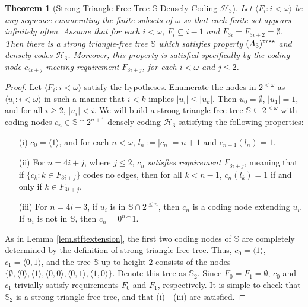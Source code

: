 \documentclass{amsart}
\newtheorem{thm}{Theorem}[section]
\theoremstyle{remark}
\theoremstyle{definition}
\theoremstyle{remark}
\newcommand{\om}{\omega}
\newcommand{\sse}{\subseteq}
\newcommand{\bS}{\mathbb{S}}
\newcommand{\lgl}{\langle}
\newcommand{\rgl}{\rangle}
\begin{document}
\begin{thm}[Strong Triangle-Free Tree $\bS$  Densely Coding $\mathcal{H}_3$]\label{thm.stftree}
Let  $\lgl F_i:i<\om\rgl$  be any sequence enumerating the finite subsets of $\om$  so  that each finite set appears infinitely often.
Assume  that
  for each $i<\om$,
 $F_i\sse i-1$ and  $F_{3i}=F_{3i+2}=\emptyset$.
Then there is a strong triangle-free tree $\bS$ which
 satisfies
property $(A_3)^{\tt tree}$
and
 densely codes $\mathcal{H}_3$.
Moreover, this property is satisfied specifically by
the coding node $c_{4i+j}$  meeting  requirement $F_{3i+j}$,
 for each $i<\om$ and $j\le 2$.
\end{thm}



\begin{proof}
Let  $\lgl F_i:i<\om \rgl$  satisfy the hypotheses.
Enumerate the nodes in $2^{<\om}$ as
 $\lgl u_i: i<\om\rgl$
 in such a manner that $i<k$ implies $|u_i|\le |u_k|$.
Then $u_0=\emptyset$, $|u_1|=1$, and for all $i\ge 2$, $|u_i|<i$.
We will build a strong triangle-free tree $\bS\sse 2^{<\om}$ with  coding nodes $c_n\in\bS\cap 2^{n+1}$ densely coding $\mathcal{H}_3$ satisfying the following properties:
\begin{enumerate}


\item[(i)]
$c_0=\lgl 1\rgl$, and
for each $n<\om$,  $l_n:=|c_n|=n+1$ and   $c_{n+1}(l_n)=1$.
\item[(ii)]
For $n=4i+j$, where  $j\le 2$, $c_{n}$ {\em satisfies requirement $F_{3i+j}$},
meaning that if $\{c_k:k\in F_{3i+j}\}$ codes no edges,
then for all $k< n-1$,
$c_n(l_k)=1$ if and only if $k\in F_{3i+j}$.
\item[(iii)]
For $n=4i+3$, if $u_i$ is in  $\bS\cap 2^{\le n}$,
then $c_n$ is a coding node extending $u_i$.
If $u_i$ is not in
$\bS$, then
 $c_n={0^n}^{\frown}1$.
\end{enumerate}


As in Lemma \ref{lem.stftextension},
the first two coding nodes of $\bS$ are completely determined by the definition of strong triangle-free tree.
Thus, $c_0=\lgl 1\rgl$, $c_1=\lgl 0,1\rgl$,
and the tree $\bS$ up to height $2$ consists of the nodes
$\{\emptyset,\lgl 0\rgl, \lgl 1\rgl, \lgl 0,0\rgl,\lgl 0,1\rgl,\lgl 1,0\rgl\}$.
Denote this tree as $\bS_2$.
Since  $F_0=F_1=\emptyset$,  $c_0$ and $c_1$ trivially satisfy requirements $F_0$ and $F_1$, respectively.
It is simple to check that $\bS_2$  is a strong triangle-free tree,  and that (i) - (iii) are satisfied.




\end{proof}
\end{document}
